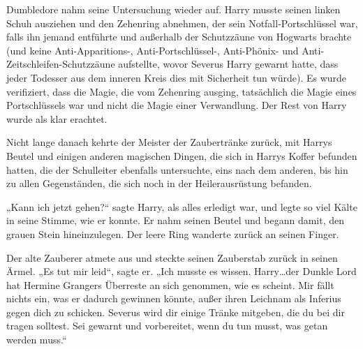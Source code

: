 Dumbledore nahm seine Untersuchung wieder auf. Harry musste seinen linken Schuh ausziehen und den Zehenring abnehmen, der sein Notfall-Portschlüssel war, falls ihn jemand entführte und außerhalb der Schutzzäune von Hogwarts brachte (und keine Anti-Apparitions-, Anti-Portschlüssel-, Anti-Phönix- und Anti-Zeitschleifen-Schutzzäune aufstellte, wovor Severus Harry gewarnt hatte, dass jeder Todesser aus dem inneren Kreis dies mit Sicherheit tun würde). Es wurde verifiziert, dass die Magie, die vom Zehenring ausging, tatsächlich die Magie eines Portschlüssels war und nicht die Magie einer Verwandlung. Der Rest von Harry wurde als klar erachtet.

Nicht lange danach kehrte der Meister der Zaubertränke zurück, mit Harrys Beutel und einigen anderen magischen Dingen, die sich in Harrys Koffer befunden hatten, die der Schulleiter ebenfalls untersuchte, eins nach dem anderen, bis hin zu allen Gegenständen, die sich noch in der Heilerausrüstung befanden.

„Kann ich jetzt gehen?“ sagte Harry, als alles erledigt war, und legte so viel Kälte in seine Stimme, wie er konnte. Er nahm seinen Beutel und begann damit, den grauen Stein hineinzulegen. Der leere Ring wanderte zurück an seinen Finger.

Der alte Zauberer atmete aus und steckte seinen Zauberstab zurück in seinen Ärmel.
„Es tut mir leid“, sagte er. „Ich musste es wissen. Harry…der Dunkle Lord hat Hermine Grangers Überreste an sich genommen, wie es scheint. Mir fällt nichts ein, was er dadurch gewinnen könnte, außer ihren Leichnam als Inferius gegen dich zu schicken. Severus wird dir einige Tränke mitgeben, die du bei dir tragen solltest. Sei gewarnt und vorbereitet, wenn du tun musst, was getan werden muss.“

